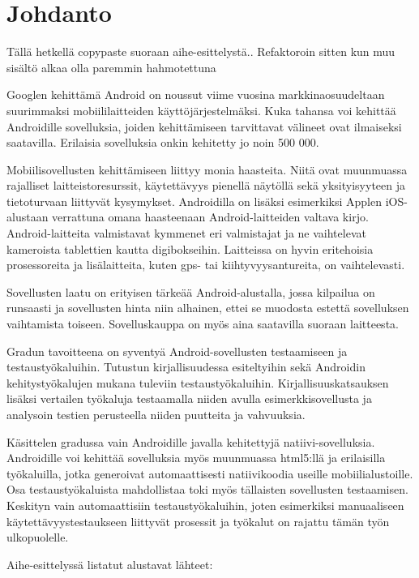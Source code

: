 \section{Johdanto}

Tällä hetkellä copypaste suoraan aihe-esittelystä.. Refaktoroin sitten kun muu sisältö alkaa olla paremmin hahmotettuna

Googlen kehittämä Android on noussut viime vuosina markkinaosuudeltaan suurimmaksi mobiililaitteiden käyttöjärjestelmäksi. Kuka tahansa voi kehittää Androidille sovelluksia, joiden kehittämiseen tarvittavat välineet ovat ilmaiseksi saatavilla. Erilaisia sovelluksia onkin kehitetty jo noin 500 000.

Mobiilisovellusten kehittämiseen liittyy monia haasteita. Niitä ovat muunmuassa rajalliset laitteistoresurssit, käytettävyys pienellä näytöllä sekä yksityisyyteen ja tietoturvaan liittyvät kysymykset. Androidilla on lisäksi esimerkiksi Applen iOS-alustaan verrattuna omana haasteenaan Android-laitteiden valtava kirjo. Android-laitteita valmistavat kymmenet eri valmistajat ja ne vaihtelevat kameroista tablettien kautta digibokseihin. Laitteissa on hyvin eritehoisia prosessoreita ja lisälaitteita, kuten gps- tai kiihtyvyysantureita, on vaihtelevasti.

Sovellusten laatu on erityisen tärkeää Android-alustalla, jossa kilpailua on runsaasti ja sovellusten hinta niin alhainen, ettei se muodosta estettä sovelluksen vaihtamista toiseen. Sovelluskauppa on myös aina saatavilla suoraan laitteesta.

Gradun tavoitteena on syventyä Android-sovellusten testaamiseen ja testaustyökaluihin. Tutustun kirjallisuudessa esiteltyihin sekä Androidin kehitystyökalujen mukana tuleviin testaustyökaluihin. Kirjallisuuskatsauksen lisäksi vertailen työkaluja testaamalla niiden avulla esimerkkisovellusta ja analysoin testien perusteella niiden puutteita ja vahvuuksia.

Käsittelen gradussa vain Androidille javalla kehitettyjä natiivi-sovelluksia. Androidille voi kehittää sovelluksia myös muunmuassa html5:llä ja erilaisilla työkaluilla, jotka generoivat automaattisesti natiivikoodia useille mobiilialustoille. Osa testaustyökaluista mahdollistaa toki myös tällaisten sovellusten testaamisen. Keskityn vain automaattisiin testaustyökaluihin, joten esimerkiksi manuaaliseen käytettävyystestaukseen liittyvät prosessit ja työkalut on rajattu tämän työn ulkopuolelle.

Aihe-esittelyssä listatut alustavat lähteet: 
\cite{takalaetal11} 
\cite{hyungkeunetal11}
\cite{maetal11}
\cite{spataru10}
\cite{kropp10}
\cite{mirzaeietal12}
\cite{hu10}
\cite{wasserman10}
\cite{hampark11}